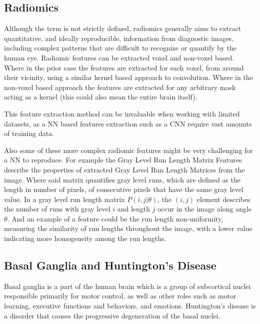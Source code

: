 \subsection{Radiomics}

Although the term is not strictly defined, radiomics generally aims to extract quantitative, and ideally reproducible, information from diagnostic images, including complex patterns that are difficult to recognize or quantify by the human eye. \cite{radio} Radiomic features can be extracted voxel and non-voxel based. Where in the prior case the features are extracted for each voxel, from around their vicinity, using a similar kernel based approach to convolution. Where in the non-voxel based approach the features are extracted for any arbitrary mask acting as a kernel (this could also mean the entire brain itself).\par
This feature extraction method can be invaluable when working with limited datasets, as a \ac{NN} based features extraction such as a \ac{CNN} require vast amounts of training data.\par
Also some of these more complex radiomic features might be very challenging for a \ac{NN} to reproduce. For example the Gray Level Run Length Matrix Features describe the properties of extracted Gray Level Run Length Matrices from the image. Where said matrix quantifies gray level runs, which are defined as the length in number of pixels, of consecutive pixels that have the same gray level value. In a gray level run length matrix $P(i,j|\theta)$, the $(i,j)$ element describes the number of runs with gray level $i$ and length $j$ occur in the image along angle $\theta$. And an example of a feature could be the run length non-uniformity, measuring the similarity of run lengths throughout the image, with a lower value indicating more homogeneity among the run lengths. \cite{radio2}

\subsection{Basal Ganglia and Huntington’s Disease}

Basal ganglia is a part of the human brain which is a group of subcortical nuclei responsible primarily for motor control, as well as other roles such as motor learning, executive functions and behaviors, and emotions. \cite{basal} Huntington’s disease is a disorder that causes the progressive degeneration of the basal nuclei. \cite{hunting}\par

